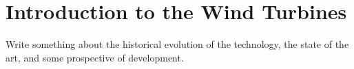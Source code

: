 \newpage
\section{Introduction to the Wind Turbines}\label{sec:c_WT_characteristics}
Write something about the historical evolution of the technology, the state of the art, and some prospective of development. 